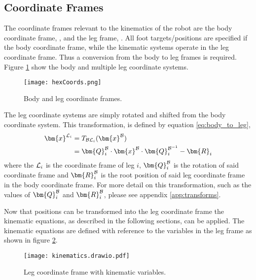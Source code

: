         \subsection{Coordinate Frames}
            The coordinate frames relevant to the kinematics of the robot are the body coordinate frame, \fbody, and the leg frame, \fleg. All foot targets/positions are specified
            if the body coordinate frame, while the kinematic systems operate in the leg coordinate frame. Thus a conversion from the body to leg frames is required. 
            Figure \ref{fig:coords_top} show the body and multiple leg coordinate systems.
            \begin{figure}[h]
                \centering
                \texttt{[image: hexCoords.png]}
                \caption{Body and leg coordinate frames.}
                \label{fig:coords_top}
            \end{figure}
            The leg coordinate systems are simply rotated and shifted from the body coordinate system. This transformation, is defined by equation \ref{eq:body_to_leg},
            \begin{equation}\label{eq:body_to_leg}
            \begin{split}
                \bm{x}^\fleg &= \transframe{\bm{x}^\fbody}{\fbody}{\fleg} \\
                & = \bm{Q}_i^\fbody\cdot\bm{x}^\fbody\cdot\bm{Q}^{\fbody^{-1}}_{i} - \bm{R}_i
            \end{split}
            \end{equation}
            where the \(\fleg\) is the coordinate frame of leg \(i\), \(\bm{Q}_i^\fbody\) is the rotation of said coordinate frame and \(\bm{R}^\fbody_i\) is the root position of
            said leg coordinate frame in the body coordinate frame. For more detail on this transformation, such as the values of \(\bm{Q}_i^\fbody\) and \(\bm{R}^\fbody_i\), please see
            appendix \ref{app:transforms}.

            Now that positions can be transformed into the leg coordinate frame the kinematic equations, as described in the following sections, can be applied. The kinematic equations are defined
            with reference to the variables in the leg frame as shown in figure \ref{fig:kinematics}.
            \begin{figure}[h]
                \centering
                \texttt{[image: kinematics.drawio.pdf]}
                \caption{Leg coordinate frame with kinematic variables.}
                \label{fig:kinematics}
            \end{figure}

